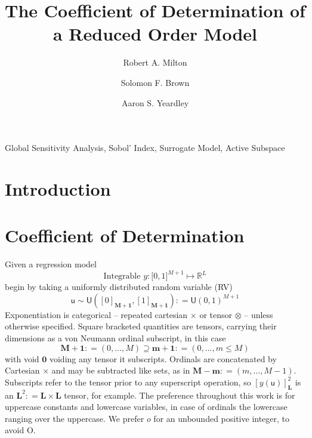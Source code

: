 \documentclass[preprint,12pt]{elsarticle}
\newcommand*{\M}[1]{\ensuremath{#1}\xspace}
\newcommand*{\x}{\times}
\newcommand*{\mi}[1]{\mathbf{#1}}
\newcommand*{\st}[1]{\mathbb{#1}}
\newcommand*{\rv}[1]{\mathsf{#1}}
\newcommand*{\te}[2][]{\left\lbrack{#2}\right\rbrack_{#1}}
\newcommand*{\deq}{\M{\mathrel{\mathop:}=}}
\newcommand{\T}[1]{\text{#1}}
\newcommand*{\uni}[2]{\mathsf{U}\!\left({#1,#2}\right)}
\newcommand*{\uniti}{\lbrack 0,1\rbrack}
\begin{document}
\begin{frontmatter}

    \title{The Coefficient of Determination of a Reduced Order Model}

    \author{Robert A. Milton}

    \author{Solomon F. Brown}

    \author{Aaron S. Yeardley}

    \address{Department of Chemical and Biological Engineering, University of Sheffield, Sheffield, S1 3JD, United Kingdom}       

    \begin{abstract}
    \end{abstract}

    \begin{keyword}
        Global Sensitivity Analysis, Sobol' Index, Surrogate Model, Active Subspace
    \end{keyword}

\end{frontmatter}

\section{Introduction}\label{sec:Intro}


\section{Coefficient of Determination}\label{sec:COD}
    Given a regression model
    \begin{equation*}
        \T{Integrable } y \colon \uniti^{M+1} \mapsto \st{R}^{L}
    \end{equation*}
    begin by taking a uniformly distributed random variable (RV)
    \begin{equation*}
        \rv{u} \sim \uni{\te[\mi{M+1}]{0}}{\te[\mi{M+1}]{1}} \deq \uni{0}{1}^{M+1}
    \end{equation*}
    Exponentiation is categorical -- repeated cartesian $\x$ or tensor $\otimes$ -- unless otherwise specified. Square bracketed quantities are tensors, carrying their dimensions as a von Neumann ordinal subscript, in this case
    \begin{equation*}
        \mi{M+1} \deq (0,\ldots,M) \supseteq \mi{m+1} \deq (0,\ldots,m \leq M)
    \end{equation*}
    with void $\mi{0}$ voiding any tensor it subscripts. Ordinals are concatenated by Cartesian $\times$ and may be subtracted like sets, as in $\mi{M-m} \deq (m,\ldots,M-1)$. 
    Subscripts refer to the tensor prior to any superscript operation, so $\te[\mi{L}]{y(\rv{u})}^{2}$ is an $\mi{L}^{2} \deq \mi{L\x L}$ tensor, for example.
    The preference throughout this work is for uppercase constants and lowercase variables, in case of ordinals the lowercase ranging over the uppercase. We prefer $o$ for an unbounded positive integer, to avoid O.
\end{document}
